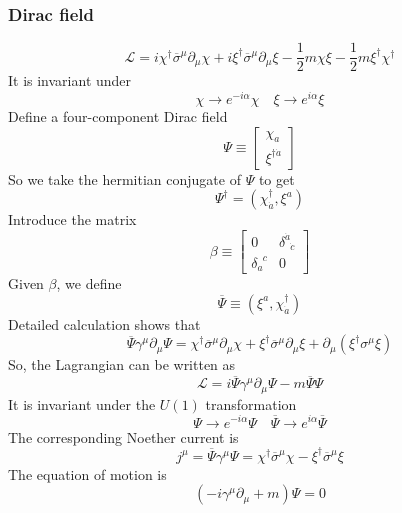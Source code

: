 \subsubsection{Dirac field}
\[\mathcal{L} = i \chi^{\dagger} \overline{\sigma}^{\mu} \partial_{\mu} \chi + i \xi^{\dagger} \overline{\sigma}^{\mu} \partial_{\mu} \xi- \frac{1}{2}m \chi\xi - \frac{1}{2}m \xi^{\dagger} \chi^{\dagger}\]
It is invariant under
\[\chi \to e^{-i\alpha}\chi \quad \xi \to e^{i\alpha}\xi\]
Define a four-component Dirac field
\[\Psi \equiv \left[ \begin{matrix} \chi_a \\ \xi^{\dagger \dot{a}}\end{matrix} \right] \]
So we take the hermitian conjugate of $\Psi$ to get
\[\Psi^{\dagger} = (\chi^{\dagger}_{\dot{a}}, \xi^{a})\]
Introduce the matrix
\[\beta \equiv \left[ \begin{matrix} 0& \delta^{\dot{a}}_{\phantom{a}\dot{c}}\\ \delta_a^{\phantom{a}c}& 0\end{matrix} \right]\]
Given $\beta$, we define
\[\overline{\Psi} \equiv (\xi^{a},\chi^{\dagger}_{\dot{a}})\]
Detailed calculation shows that
\[\overline{\Psi} \gamma^{\mu} \partial_{\mu} \Psi =  \chi^{\dagger} \overline{\sigma}^{\mu} \partial_{\mu} \chi +  \xi^{\dagger} \overline{\sigma}^{\mu} \partial_{\mu} \xi + \partial_{\mu}( \xi^{\dagger} \sigma^{\mu} \xi)\]
So, the Lagrangian can be written as
\[\mathcal{L} = i\overline{\Psi} \gamma^{\mu} \partial_{\mu} \Psi - m\overline{\Psi}\Psi\]
It is invariant under the $U(1)$ transformation
\[\Psi \to e^{-i\alpha}\Psi \quad \overline{\Psi} \to e^{i\alpha}\overline{\Psi}\]
The corresponding Noether current is
\[j^{\mu} = \overline{\Psi}\gamma^{\mu}\Psi = \chi^{\dagger} \overline{\sigma}^{\mu}  \chi -  \xi^{\dagger} \overline{\sigma}^{\mu} \xi\]
The equation of motion is
\[(-i\gamma^{\mu}\partial_{\mu}+m)\Psi=0\]


